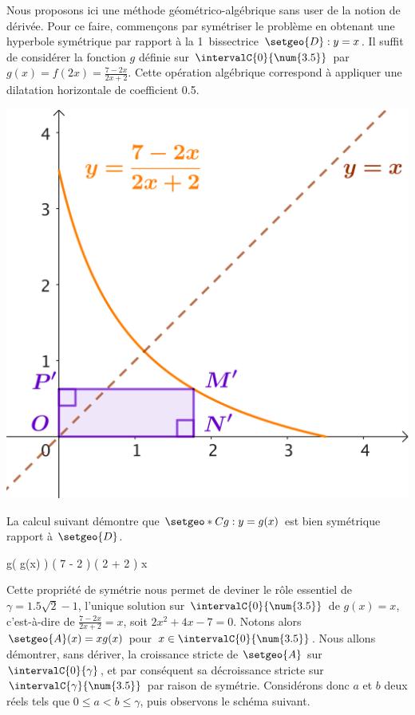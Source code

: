Nous proposons ici une méthode géométrico-algébrique sans user de la notion de dérivée.
%
Pour ce faire, commençons par symétriser le problème en obtenant une hyperbole symétrique par rapport à la 1\iere\ bissectrice $\setgeo{D}: y = x$.
Il suffit de considérer la fonction $g$ définie sur $\intervalC{0}{\num{3.5}}$ par $g(x) = f(2x) = \frac{7-2x}{2x+2}$. Cette opération algébrique correspond à appliquer une dilatation horizontale de coefficient \num{.5}.

\smallskip

\begin{center}
	\includegraphics[scale=.67]{symmetric-goal.png}
\end{center}

La calcul suivant démontre que $\setgeo*{C}{g}: y = g(x)$ est bien symétrique rapport à $\setgeo{D}$.

\smallskip
\begin{stepcalc}[style=sar]
	g\big( g(x) \big)
\explnext{}
	     \Big( 7 - 2 \cdot {} \Big)
	\div \Big( 2 \cdot {} + 2 \Big)
\explnext{}
\explnext{}
\explnext{}
	x
\end{stepcalc}
\smallskip




Cette propriété de symétrie nous permet de deviner le rôle essentiel de
$\gamma = \num{1.5} \sqrt{2} - 1$, %
l'unique solution sur $\intervalC{0}{\num{3.5}}$ de 
$g(x) = x$,
c'est-à-dire de 
$\frac{7-2x}{2x+2} = x$,
soit
$2 x^2 + 4 x - 7 = 0$.
%
Notons alors $\setgeo{A}(x) = x g(x)$ pour $x \in \intervalC{0}{\num{3.5}}$.
Nous allons démontrer, sans dériver, la croissance stricte de $\setgeo{A}$ sur $\intervalC{0}{\gamma}$, et par conséquent sa décroissance stricte sur $\intervalC{\gamma}{\num{3.5}}$ par raison de symétrie.
%
Considérons donc $a$ et $b$ deux réels tels que $0 \leq a < b \leq \gamma$, puis observons le schéma suivant.

